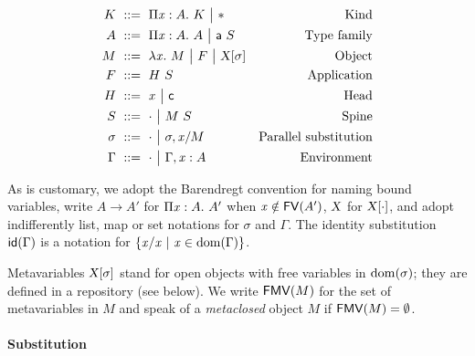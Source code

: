 \documentclass[9pt]{sigplanconf}
\begin{document}
\begin{align*}
  K &\ ::=\ 
  \Pi{\ensuremath{\text{\textit{x}}}}:{A}.\  K \ {\big|}\ 
  \mathsf{*} &
  \text{Kind}\\
  A &\ ::=\ 
  \Pi{\ensuremath{\text{\textit{x}}}}:{A}.\  A \ {\big|}\ 
  {\text{\textsf{a}}}\  S &
  \text{Type family} \\
  M &\ ::=\ 
  \lambda{\ensuremath{\text{\textit{x}}}}.\  M \ {\big|}\ 
  F \ {\big|}\ 
  {\text{\textsl{X}}}[{\sigma}] &
  \text{Object} \\
  F &\ ::=\  {H}\  S &
  \text{Application} \\
  H &\ ::=\ 
  \text{\textit{x}} \ {\big|}\ 
  \text{\textsf{c}} &
  \text{Head}\\
  S &\ ::=\ 
  \cdot \ {\big|}\ 
  {M}\ {S} &
  \text{Spine}\\
  \sigma &\ ::=\ 
  \cdot \ {\big|}\ 
  {\sigma},{{\text{\textit{x}}}/{M}} &
  \text{Parallel substitution} \\
  \Gamma &\ ::=\ 
  \cdot \ {\big|}\ 
  {\Gamma},{{\text{\textit{x}}}:{A}} &
  \text{Environment}
\end{align*}

As is customary, we adopt the Barendregt convention for naming bound
variables, write $A\to A'$ for $\Pi{\ensuremath{\text{\textit{x}}}}:{A}.\  A'$ when $\text{\textit{x}}\notin {\text{\textsf{FV}}}({A'})$,
$\text{\textsl{X}}$ for ${\text{\textsl{X}}}[{\cdot}]$, and adopt indifferently list, map
or set notations for $\sigma$ and $\Gamma$. The identity substitution
${\text{\textsf{id}}}({\Gamma})$ is a notation for $\{{\text{\textit{x}}}/{\text{\textit{x}}}\ |\ \text{\textit{x}}
\in\operatorname{dom}{\!(\Gamma)}\}$.

Metavariables ${\text{\textsl{X}}}[{\sigma}]$ stand for open objects with free
variables in $\operatorname{dom}{\!(\sigma)}$; they are defined in a repository (see
below). We write ${\text{\textsf{FMV}}}({M})$ for the set of metavariables in $M$ and
speak of a \emph{metaclosed} object $M$ if ${\text{\textsf{FMV}}}({M}) = \emptyset$.

\paragraph{Substitution}
\end{document}
